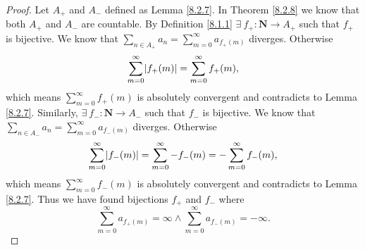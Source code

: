 \begin{proof}
    Let \(A_+\) and \(A_-\) defined as Lemma \ref{8.2.7}.
    In Theorem \ref{8.2.8} we know that both \(A_+\) and \(A_-\) are countable.
    By Definition \ref{8.1.1} \(\exists\ f_+ : \mathbf{N} \to A_+\) such that \(f_+\) is bijective.
    We know that \(\sum_{n \in A_+} a_n = \sum_{m = 0}^\infty a_{f_+(m)}\) diverges.
    Otherwise
    \[
        \sum_{m = 0}^\infty \abs*{f_+(m)} = \sum_{m = 0}^\infty f_+(m),
    \]
    which means \(\sum_{m = 0}^\infty f_+(m)\) is absolutely convergent and contradicts to Lemma \ref{8.2.7}.
    Similarly, \(\exists\ f_- : \mathbf{N} \to A_-\) such that \(f_-\) is bijective.
    We know that \(\sum_{n \in A_-} a_n = \sum_{m = 0}^\infty a_{f_-(m)}\) diverges.
    Otherwise
    \[
        \sum_{m = 0}^\infty \abs*{f_-(m)} = \sum_{m = 0}^\infty -f_-(m) = -\sum_{m = 0}^\infty f_-(m),
    \]
    which means \(\sum_{m = 0}^\infty f_-(m)\) is absolutely convergent and contradicts to Lemma \ref{8.2.7}.
    Thus we have found bijections \(f_+\) and \(f_-\) where
    \[
        \sum_{m = 0}^\infty a_{f_+(m)} = \infty \land \sum_{m = 0}^\infty a_{f_-(m)} = -\infty.
    \]
\end{proof}